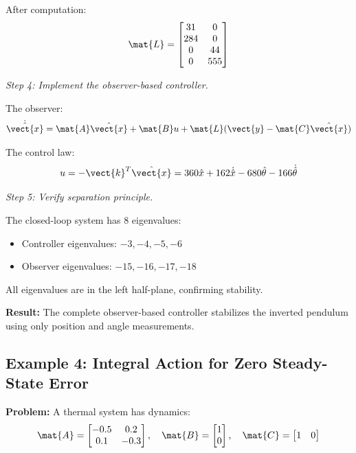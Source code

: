 After computation:
\begin{equation}
\mat{L} = \begin{bmatrix} 31 & 0 \\ 284 & 0 \\ 0 & 44 \\ 0 & 555 \end{bmatrix}
\end{equation}

\textit{Step 4: Implement the observer-based controller.}

The observer:
\begin{equation}
\dot{\hat{\vect{x}}} = \mat{A}\hat{\vect{x}} + \mat{B}u + \mat{L}(\vect{y} - \mat{C}\hat{\vect{x}})
\end{equation}

The control law:
\begin{equation}
u = -\vect{k}^T\hat{\vect{x}} = 360\hat{x} + 162\dot{\hat{x}} - 680\hat{\theta} - 166\dot{\hat{\theta}}
\end{equation}

\textit{Step 5: Verify separation principle.}

The closed-loop system has 8 eigenvalues:
\begin{itemize}
    \item Controller eigenvalues: $-3, -4, -5, -6$
    \item Observer eigenvalues: $-15, -16, -17, -18$
\end{itemize}

All eigenvalues are in the left half-plane, confirming stability.

\textbf{Result:} The complete observer-based controller stabilizes the inverted pendulum using only position and angle measurements.

\subsection{Example 4: Integral Action for Zero Steady-State Error}

\textbf{Problem:} A thermal system has dynamics:
\begin{equation}
\mat{A} = \begin{bmatrix} -0.5 & 0.2 \\ 0.1 & -0.3 \end{bmatrix}, \quad
\mat{B} = \begin{bmatrix} 1 \\ 0 \end{bmatrix}, \quad
\mat{C} = \begin{bmatrix} 1 & 0 \end{bmatrix}
\end{equation}

